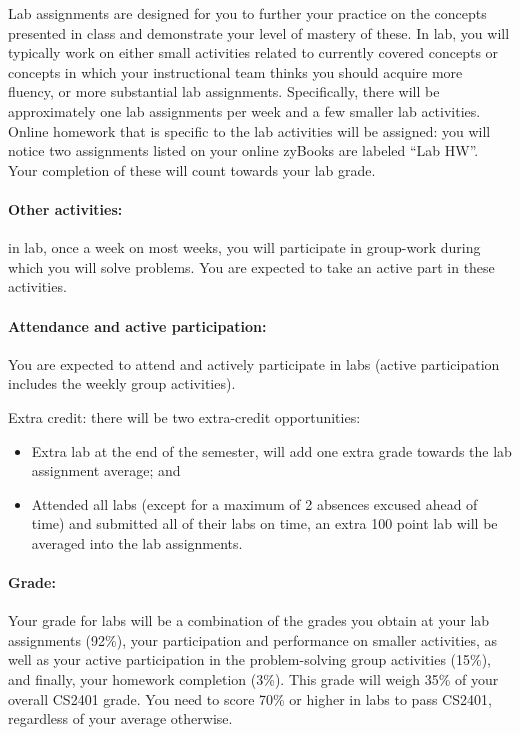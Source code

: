 \documentclass[12pt]{scrartcl}
\begin{document}
Lab assignments are designed for you to further your practice on the concepts presented in class and demonstrate your level of mastery of these. 
In lab, you will typically work on either small activities related to currently covered concepts or concepts in which your instructional team thinks you should acquire more fluency, or more substantial lab assignments. 
Specifically, there will be approximately one lab assignments per week and a few smaller lab activities. 
Online homework that is specific to the lab activities will be assigned: you will notice two assignments listed on your online zyBooks are labeled “Lab HW”. 
Your completion of these will count towards your lab grade. 

\paragraph{Other activities:} in lab, once a week on most weeks, you will participate in group-work during which you will solve problems. 
You are expected to take an active part in these activities.

\paragraph{Attendance and active participation:} You are expected to attend and actively participate in labs (active participation includes the weekly group activities). 

Extra credit: there will be two extra-credit opportunities: 
\begin{itemize}
\item Extra lab at the end of the semester, will add one extra grade towards the lab assignment average; and 
\item Attended all labs (except for a maximum of 2 absences excused ahead of time) and submitted all of their labs on time, an extra 100 point lab will be averaged into the lab assignments.
\end{itemize}

\paragraph{Grade:} Your grade for labs will be a combination of the grades you obtain at your lab assignments (92\%), your participation and performance on smaller activities, as well as your active participation in the problem-solving group activities (15\%), and finally, your homework completion (3\%). 
This grade will weigh 35\% of your overall CS2401 grade. 
You need to score 70\% or higher in labs to pass CS2401, regardless of your average otherwise.
\end{document}
